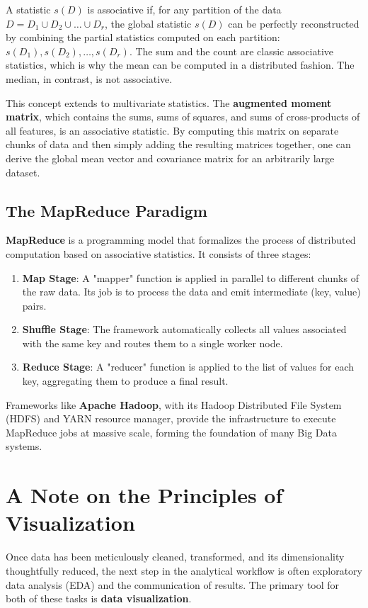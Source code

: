 \begin{enumerate}
A statistic $s(D)$ is associative if, for any partition of the data $D = D_1 \cup D_2 \cup \dots \cup D_r$, the global statistic $s(D)$ can be perfectly reconstructed by combining the partial statistics computed on each partition: $s(D_1), s(D_2), \dots, s(D_r)$. The sum and the count are classic associative statistics, which is why the mean can be computed in a distributed fashion. The median, in contrast, is not associative.

This concept extends to multivariate statistics. The \textbf{augmented moment matrix}, which contains the sums, sums of squares, and sums of cross-products of all features, is an associative statistic. By computing this matrix on separate chunks of data and then simply adding the resulting matrices together, one can derive the global mean vector and covariance matrix for an arbitrarily large dataset.

\subsection{The MapReduce Paradigm}
\textbf{MapReduce} is a programming model that formalizes the process of distributed computation based on associative statistics. It consists of three stages:
\begin{enumerate}
    \item \textbf{Map Stage}: A "mapper" function is applied in parallel to different chunks of the raw data. Its job is to process the data and emit intermediate (key, value) pairs.
    \item \textbf{Shuffle Stage}: The framework automatically collects all values associated with the same key and routes them to a single worker node.
    \item \textbf{Reduce Stage}: A "reducer" function is applied to the list of values for each key, aggregating them to produce a final result.
\end{enumerate}
Frameworks like \textbf{Apache Hadoop}, with its Hadoop Distributed File System (HDFS) and YARN resource manager, provide the infrastructure to execute MapReduce jobs at massive scale, forming the foundation of many Big Data systems.

\section{A Note on the Principles of Visualization}
\label{sec:visualization_principles_note}
Once data has been meticulously cleaned, transformed, and its dimensionality thoughtfully reduced, the next step in the analytical workflow is often exploratory data analysis (EDA) and the communication of results. The primary tool for both of these tasks is \textbf{data visualization}.


\end{enumerate}
